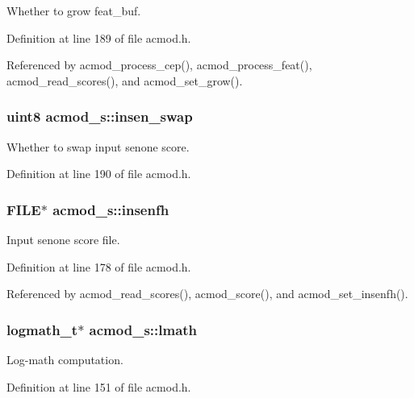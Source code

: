 Whether to grow feat\+\_\+buf. 



Definition at line 189 of file acmod.\+h.



Referenced by acmod\+\_\+process\+\_\+cep(), acmod\+\_\+process\+\_\+feat(), acmod\+\_\+read\+\_\+scores(), and acmod\+\_\+set\+\_\+grow().

\subsubsection[{insen\+\_\+swap}]{\setlength{\rightskip}{0pt plus 5cm}uint8 acmod\+\_\+s\+::insen\+\_\+swap}\label{structacmod__s_ae6ed7e1e5b4bec021a0ba17c0ac02bd7}


Whether to swap input senone score. 



Definition at line 190 of file acmod.\+h.

\subsubsection[{insenfh}]{\setlength{\rightskip}{0pt plus 5cm}F\+I\+L\+E$\ast$ acmod\+\_\+s\+::insenfh}\label{structacmod__s_ad0998a9d887db82bd684e9454c9b044e}


Input senone score file. 



Definition at line 178 of file acmod.\+h.



Referenced by acmod\+\_\+read\+\_\+scores(), acmod\+\_\+score(), and acmod\+\_\+set\+\_\+insenfh().

\subsubsection[{lmath}]{\setlength{\rightskip}{0pt plus 5cm}logmath\+\_\+t$\ast$ acmod\+\_\+s\+::lmath}\label{structacmod__s_a9de7e8ac9c0c4df3d2a9ad5406787f3c}


Log-\/math computation. 



Definition at line 151 of file acmod.\+h.




